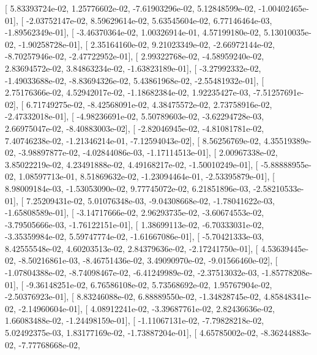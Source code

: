 \documentclass{article}
\begin{document}
       [  5.83393724e-02,   1.25776602e-02,  -7.61903296e-02,
          5.12848599e-02,  -1.00402465e-01],
       [ -2.03752147e-02,   8.59629614e-02,   5.63545604e-02,
          6.77146464e-03,  -1.89562349e-01],
       [ -3.46370364e-02,   1.00326914e-01,   4.57199180e-02,
          5.13010035e-02,  -1.90258728e-01],
       [  2.35164160e-02,   9.21023349e-02,  -2.66972144e-02,
         -8.70257946e-02,  -2.47722952e-01],
       [  2.99322768e-02,  -4.58959240e-02,   2.83694572e-02,
          3.84863234e-02,  -1.63823189e-01],
       [ -3.27992332e-02,  -1.49033688e-02,  -8.83694326e-02,
          5.43861968e-02,  -2.55481932e-01],
       [  2.75176366e-02,   4.52942017e-02,  -1.18682384e-02,
          1.92235427e-03,  -7.51257691e-02],
       [  6.71749275e-02,  -8.42568091e-02,   4.38475572e-02,
          2.73758916e-02,  -2.47332018e-01],
       [ -4.98236691e-02,   5.50789603e-02,  -3.62294728e-03,
          2.66975047e-02,  -8.40883003e-02],
       [ -2.82046945e-02,  -4.81081781e-02,   7.40746238e-02,
         -1.21346214e-01,  -7.12594043e-02],
       [  8.56256769e-02,   4.35519389e-02,  -3.98897877e-02,
         -4.02844086e-03,  -1.17114513e-01],
       [  2.00967338e-02,   3.85022219e-02,   4.23491888e-02,
          4.49168217e-02,  -1.50010249e-01],
       [ -5.88888955e-02,   1.08597713e-01,   8.51869632e-02,
         -1.23094464e-01,  -2.53395879e-01],
       [  8.98009184e-03,  -1.53053090e-02,   9.77745072e-02,
          6.21851896e-03,  -2.58210533e-01],
       [  7.25209431e-02,   5.01076348e-03,  -9.04308668e-02,
         -1.78041622e-03,  -1.65808589e-01],
       [ -3.14717666e-02,   2.96293735e-02,  -3.60674553e-02,
         -3.79505666e-03,  -1.76122151e-01],
       [  1.38699113e-02,  -6.70333031e-02,  -3.35359984e-02,
          5.59747774e-02,  -1.61667086e-01],
       [ -5.70421333e-03,   8.42555548e-02,   4.60203513e-02,
          2.84379636e-02,  -2.17241750e-01],
       [  4.53639445e-02,  -8.50216861e-03,  -8.46751436e-02,
          3.49090970e-02,  -9.01566460e-02],
       [ -1.07804388e-02,  -8.74098467e-02,  -6.41249989e-02,
         -2.37513032e-03,  -1.85778208e-01],
       [ -9.36148251e-02,   6.76586108e-02,   5.73568692e-02,
          1.95767904e-02,  -2.50376923e-01],
       [  8.83246088e-02,   6.88889550e-02,  -1.34828745e-02,
          4.85848341e-02,  -2.14960604e-01],
       [  4.08912241e-02,  -3.39687761e-02,   2.82436636e-02,
          1.66083488e-02,  -1.24498159e-01],
       [ -1.11067131e-02,  -7.79828218e-02,   5.02492375e-03,
          1.83177169e-02,  -1.73887204e-01],
       [  4.65785002e-02,  -8.36244883e-02,  -7.77768668e-02,
\end{document}
